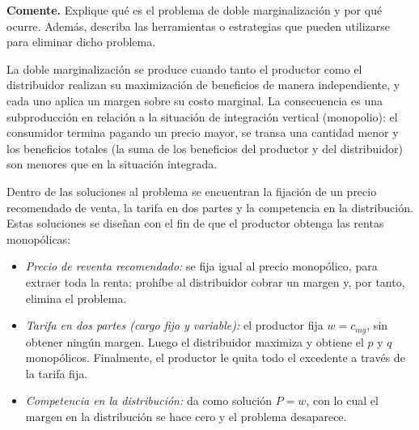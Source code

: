 \question \textbf{Comente.} Explique qué es el problema de doble marginalización y por qué ocurre. Además, describa las herramientas o estrategias que pueden utilizarse para eliminar dicho problema.
\begin{solution}
La doble marginalización se produce cuando tanto el productor como el distribuidor realizan su maximización de beneficios de manera independiente, y cada uno aplica un margen sobre su costo marginal. La consecuencia es una subproducción en relación a la situación de integración vertical (monopolio): el consumidor termina pagando un precio mayor, se transa una cantidad menor y los beneficios totales (la suma de los beneficios del productor y del distribuidor) son menores que en la situación integrada.

Dentro de las soluciones al problema se encuentran la fijación de un precio recomendado de venta, la tarifa en dos partes y la competencia en la distribución. Estas soluciones se diseñan con el fin de que el productor obtenga las rentas monopólicas:
\begin{itemize}
  \item \emph{Precio de reventa recomendado:} se fija igual al precio monopólico, para extraer toda la renta; prohíbe al distribuidor cobrar un margen y, por tanto, elimina el problema.
  \item \emph{Tarifa en dos partes (cargo fijo y variable):} el productor fija $w = c_{mg}$, sin obtener ningún margen. Luego el distribuidor maximiza y obtiene el $p$ y $q$ monopólicos. Finalmente, el productor le quita todo el excedente a través de la tarifa fija.
  \item \emph{Competencia en la distribución:} da como solución $P = w$, con lo cual el margen en la distribución se hace cero y el problema desaparece.
\end{itemize}

\end{solution}


